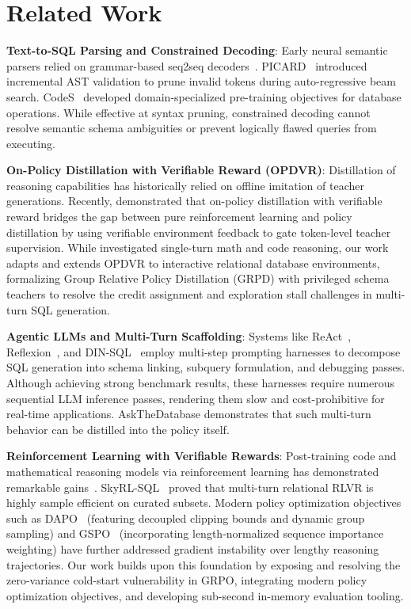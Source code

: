 \documentclass{article}
\theoremstyle{plain}
\theoremstyle{definition}
\theoremstyle{remark}
\begin{document}
\section{Related Work}
\label{sec:related_work}

\textbf{Text-to-SQL Parsing and Constrained Decoding}: Early neural semantic parsers relied on grammar-based seq2seq decoders~\citep{wang2020rat_sql}. PICARD~\citep{scholak2021picard} introduced incremental AST validation to prune invalid tokens during auto-regressive beam search. CodeS~\citep{li2024codes} developed domain-specialized pre-training objectives for database operations. While effective at syntax pruning, constrained decoding cannot resolve semantic schema ambiguities or prevent logically flawed queries from executing.

\textbf{On-Policy Distillation with Verifiable Reward (OPDVR)}: Distillation of reasoning capabilities has historically relied on offline imitation of teacher generations. Recently, \citet{lin2026opdvr} demonstrated that on-policy distillation with verifiable reward bridges the gap between pure reinforcement learning and policy distillation by using verifiable environment feedback to gate token-level teacher supervision. While \citet{lin2026opdvr} investigated single-turn math and code reasoning, our work adapts and extends OPDVR to interactive relational database environments, formalizing Group Relative Policy Distillation (GRPD) with privileged schema teachers to resolve the credit assignment and exploration stall challenges in multi-turn SQL generation.

\textbf{Agentic LLMs and Multi-Turn Scaffolding}: Systems like ReAct~\citep{yao2023react}, Reflexion~\citep{shinn2024reflexion}, and DIN-SQL~\citep{pourreza2024din_sql} employ multi-step prompting harnesses to decompose SQL generation into schema linking, subquery formulation, and debugging passes. Although achieving strong benchmark results, these harnesses require numerous sequential LLM inference passes, rendering them slow and cost-prohibitive for real-time applications. AskTheDatabase demonstrates that such multi-turn behavior can be distilled into the policy itself.

\textbf{Reinforcement Learning with Verifiable Rewards}: Post-training code and mathematical reasoning models via reinforcement learning has demonstrated remarkable gains~\citep{chen2021evaluating,cobbe2021gsm8k,shao2024deepseekmath,gu2024verl}. SkyRL-SQL~\citep{nova2025skyrl} proved that multi-turn relational RLVR is highly sample efficient on curated subsets. Modern policy optimization objectives such as DAPO~\citep{yu2025dapo} (featuring decoupled clipping bounds and dynamic group sampling) and GSPO~\citep{zheng2025group} (incorporating length-normalized sequence importance weighting) have further addressed gradient instability over lengthy reasoning trajectories. Our work builds upon this foundation by exposing and resolving the zero-variance cold-start vulnerability in GRPO, integrating modern policy optimization objectives, and developing sub-second in-memory evaluation tooling.
\end{document}
